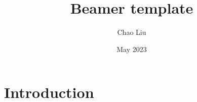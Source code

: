 \documentclass{article}
\title{Beamer template}
\author{Chao Liu}
\date{May 2023}
\begin{document}
\maketitle

\section{Introduction}
\end{document}
